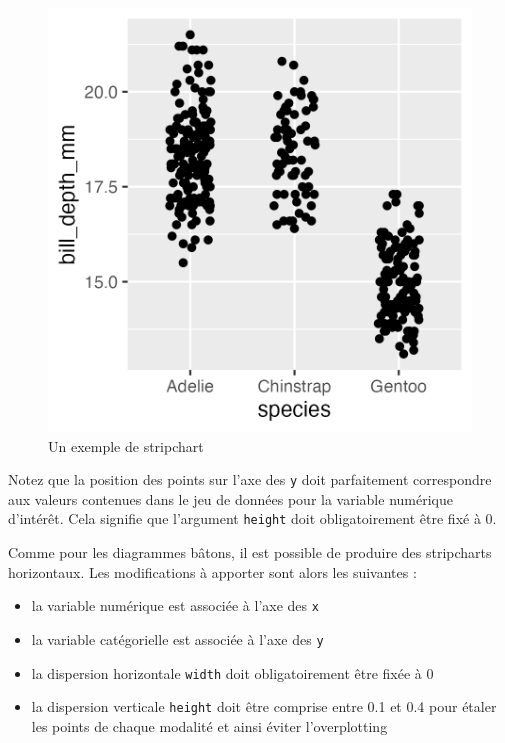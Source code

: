 \documentclass[
  letterpaper,
  DIV=11,
  numbers=noendperiod]{scrreprt}
\providecommand{\tightlist}{%
  \setlength{\itemsep}{0pt}\setlength{\parskip}{0pt}}\usepackage{longtable,booktabs,array}
\begin{document}
\begin{figure}[H]

{\centering \includegraphics{./03-visualization_files/figure-pdf/fig-facstrip-1.png}

}

\caption{\label{fig-facstrip}Un exemple de stripchart}

\end{figure}

Notez que la position des points sur l'axe des \texttt{y} doit
parfaitement correspondre aux valeurs contenues dans le jeu de données
pour la variable numérique d'intérêt. Cela signifie que l'argument
\texttt{height} doit obligatoirement être fixé à 0.

Comme pour les diagrammes bâtons, il est possible de produire des
stripcharts horizontaux. Les modifications à apporter sont alors les
suivantes :

\begin{itemize}
\tightlist
\item
  la variable numérique est associée à l'axe des \texttt{x}
\item
  la variable catégorielle est associée à l'axe des \texttt{y}
\item
  la dispersion horizontale \texttt{width} doit obligatoirement être
  fixée à 0
\item
  la dispersion verticale \texttt{height} doit être comprise entre 0.1
  et 0.4 pour étaler les points de chaque modalité et ainsi éviter
  l'overplotting
\end{itemize}
\end{document}
